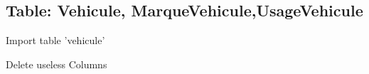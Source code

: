 \subsection{Table: Vehicule, MarqueVehicule,UsageVehicule}


Import table 'vehicule'
\begin{figure}[H]
\centering
{}
\end{figure}

Delete useless Columns
\begin{figure}[H]
\centering
{}
\end{figure}

